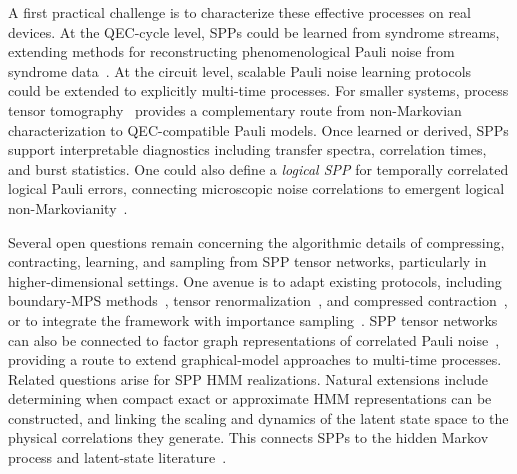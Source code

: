 \documentclass[
    aps,
    prx,
    reprint,
    superscriptaddress,
    longbibliography,
    nofootinbib,
    floatfix,
]{revtex4-2}
\begin{document}
A first practical challenge is to characterize these effective processes on real devices. At the QEC-cycle level, SPPs could be learned from syndrome streams, extending methods for reconstructing phenomenological Pauli noise from syndrome data~\cite{wagnerOptimalNoiseEstimation2021,wagnerPauliChannelsCan2022}. At the circuit level, scalable Pauli noise learning protocols~\cite{erhardCharacterizingLargescaleQuantum2019,flammiaEfficientEstimationPauli2020,harperLearningCorrelatedNoise2023,hockingsScalableNoiseCharacterization2025} could be extended to explicitly multi-time processes. For smaller systems, process tensor tomography~\cite{whiteNonMarkovianQuantumProcess2022,whiteUnifyingNonMarkovianCharacterization2025} provides a complementary route from non-Markovian characterization to QEC-compatible Pauli models. Once learned or derived, SPPs support interpretable diagnostics including transfer spectra, correlation times, and burst statistics. One could also define a \emph{logical SPP} for temporally correlated logical Pauli errors, connecting microscopic noise correlations to emergent logical non-Markovianity~\cite{ziyadEmergentNonMarkovianityLogical2026}.

Several open questions remain concerning the algorithmic details of compressing, contracting, learning, and sampling from SPP tensor networks, particularly in higher-dimensional settings. One avenue is to adapt existing protocols, including boundary-MPS methods~\cite{jordanClassicalSimulationInfinitesize2008,vanderstraetenVariationalMethodsContracting2022}, tensor renormalization~\cite{levinTensorRenormalizationGroup2007,evenblyAlgorithmsEntanglementRenormalization2009}, and compressed contraction~\cite{grayHyperoptimizedApproximateContraction2024}, or to integrate the framework with importance sampling~\cite{bravyiSimulationRareEvents2013,myersSimulatingGeneralNoise2025}. SPP tensor networks can also be connected to factor graph representations of correlated Pauli noise~\cite{flammiaEfficientEstimationPauli2020}, providing a route to extend graphical-model approaches to multi-time processes. Related questions arise for SPP HMM realizations. Natural extensions include determining when compact exact or approximate HMM representations can be constructed, and linking the scaling and dynamics of the latent state space to the physical correlations they generate. This connects SPPs to the hidden Markov process and latent-state literature~\cite{leonarde.baumMaximizationTechniqueOccurring1970,vidyasagarCompleteRealizationProblem2011}.
\end{document}
